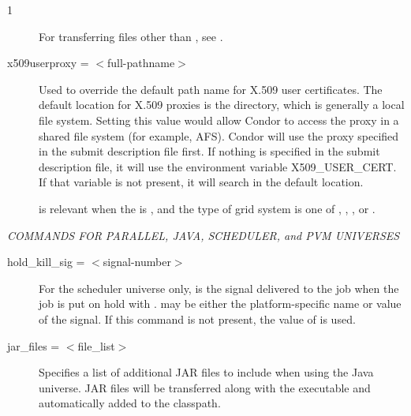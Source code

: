 \begin{ManPage}{\label{man-condor-submit}}{1}
\begin{description}
For transferring files other than ,
see .


\item[x509userproxy = $<$full-pathname$>$] Used to override the default
path name for X.509 user certificates. The default location for X.509 proxies
is the  directory,
which is generally a local file system.
Setting
this value would allow Condor to access the proxy in a shared file system
(for example, AFS).
Condor will use the proxy specified in the submit description file first.
If nothing is specified in the submit description file,
it will use the environment variable X509\_USER\_CERT.
If that variable is not present,
it will search in the default location.

 is relevant when
the  is ,
and the type of grid system is one of , ,
, or .

\end{description} 


\emph{COMMANDS FOR PARALLEL, JAVA, SCHEDULER, and PVM UNIVERSES}
\begin{description} 


\item[hold\_kill\_sig = $<$signal-number$>$] For the scheduler universe only,
 is the signal delivered
to the job when the job is put on hold
with .
 may be either the platform-specific name or value
of the signal.
If this command is not present,
the value of  is used.



\item[jar\_files = $<$file\_list$>$]
Specifies a list of additional JAR files to include when using
the Java universe.  JAR files will be transferred along with
the executable and automatically added to the classpath.



\end{description}
\end{ManPage}
